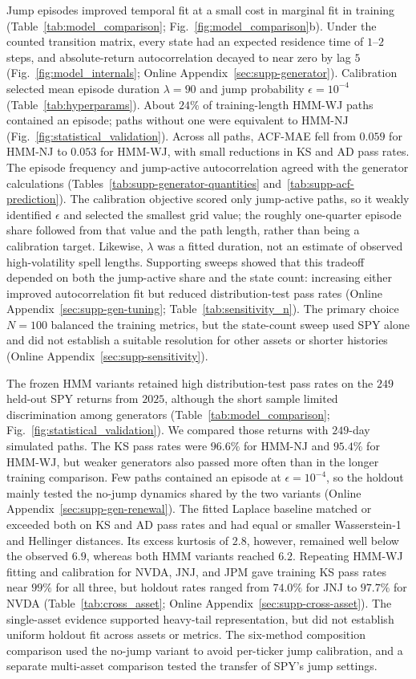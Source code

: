 Jump episodes improved temporal fit at a small cost in marginal fit
in training (Table~\ref{tab:model_comparison};
Fig.~\ref{fig:model_comparison}b). Under the counted transition
matrix, every state had an expected residence time of $1$--$2$ steps,
and absolute-return autocorrelation decayed to near zero by lag $5$
(Fig.~\ref{fig:model_internals}; Online
Appendix~\ref{sec:supp-generator}). Calibration selected mean episode
duration $\lambda=90$ and jump probability $\epsilon=10^{-4}$
(Table~\ref{tab:hyperparams}). About $24\%$ of training-length HMM-WJ
paths contained an episode; paths without one were equivalent to
HMM-NJ (Fig.~\ref{fig:statistical_validation}). Across all paths,
ACF-MAE fell from $0.059$ for HMM-NJ to $0.053$ for HMM-WJ, with
small reductions in KS and AD pass rates. The episode frequency and
jump-active autocorrelation agreed with the generator calculations
(Tables~\ref{tab:supp-generator-quantities}
and~\ref{tab:supp-acf-prediction}). The calibration objective scored
only jump-active paths, so it weakly identified $\epsilon$ and
selected the smallest grid value; the roughly one-quarter episode
share followed from that value and the path length, rather than being
a calibration target. Likewise, $\lambda$ was a fitted duration,
not an estimate of observed high-volatility spell lengths. Supporting sweeps showed that this tradeoff depended on both the
jump-active share and the state count: increasing either improved
autocorrelation fit but reduced distribution-test pass rates (Online
Appendix~\ref{sec:supp-gen-tuning}; Table~\ref{tab:sensitivity_n}).
The primary choice $N=100$ balanced the training metrics, but the
state-count sweep used SPY alone and did not establish a suitable
resolution for other assets or shorter histories (Online
Appendix~\ref{sec:supp-sensitivity}).

The frozen HMM variants retained high distribution-test pass rates on
the $249$ held-out SPY returns from $2025$, although the short sample
limited discrimination among generators
(Table~\ref{tab:model_comparison};
Fig.~\ref{fig:statistical_validation}). We compared those returns
with $249$-day simulated paths. The KS pass rates were $96.6\%$ for
HMM-NJ and $95.4\%$ for HMM-WJ, but weaker generators also passed
more often than in the longer training comparison. Few paths
contained an episode at $\epsilon=10^{-4}$, so the holdout mainly
tested the no-jump dynamics shared by the two variants (Online
Appendix~\ref{sec:supp-gen-renewal}). The fitted Laplace baseline
matched or exceeded both on KS and AD pass rates and had equal or
smaller Wasserstein-1 and Hellinger distances. Its excess kurtosis of
$2.8$, however, remained well below the observed $6.9$, whereas both
HMM variants reached $6.2$. Repeating HMM-WJ fitting and calibration
for NVDA, JNJ, and JPM gave training KS pass rates near $99\%$ for
all three, but holdout rates ranged from $74.0\%$ for JNJ to
$97.7\%$ for NVDA (Table~\ref{tab:cross_asset}; Online
Appendix~\ref{sec:supp-cross-asset}). The single-asset evidence supported heavy-tail representation, but
did not establish uniform holdout fit across assets or metrics. The six-method composition comparison used
the no-jump variant to avoid per-ticker jump calibration, and a
separate multi-asset comparison tested the transfer of SPY's jump
settings.

